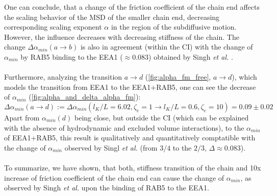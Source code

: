 \documentclass[
    paper=A4,pagesize=automedia,fontsize=12pt,
    BCOR=15mm,DIV=22,
    twoside,headinclude,footinclude=false,
    fleqn,             %
    bibliography=totocnumbered,          %
    listof=totoc,                %
    listof=flat,                 %
    cleardoublepage=empty      %
    numbers=endperiod
]{scrartcl}
\begin{document}
One can conclude, that a
change of the friction coefficient of the chain end affects the scaling behavior
of the MSD of the smaller chain end, decreasing corresponding scaling exponent $\alpha$ 
in the region of the subdiffusive motion. However, the influence decreases with 
decreasing stiffness of the chain. The change $\Delta \alpha_{min}(a \rightarrow b)$ is also
in agreement (within the CI) with the change of $\alpha_{min}$ by RAB5 binding to the EEA1 
($\approx 0.083$) obtained by Singh \emph{et al.} \cite{Singh:2022}.
\\
\\
Furthermore, analyzing the transition $a \rightarrow d$ (\autoref{fig:alpha_fm_free}, $a \rightarrow d$), 
which models the transition from 
EEA1 to the EEA1+RAB5, one can see the decrease of $\alpha_{min}$ (\autoref{fig:alpha_and_delta_alpha_fm}):
\begin{equation} \label{eq:alpha_min_l_p_zeta_e_trans}
    \Delta \alpha_{min}(a \rightarrow d) := \Delta \alpha_{min}(l_K/L=6.02,\zeta_e=1 \rightarrow l_K/L=0.6,\zeta_e=10) = 0.09 \pm 0.02
\end{equation}
Apart from $\alpha_{min}(d)$ being close, but outside the CI 
(which can be explained with the absence of hydrodynamic 
and excluded volume interactions), to the $\alpha_{min}$
of EEA1+RAB5, this result is qualitatively and quantitatively comptatible with the change
of $\alpha_{min}$ observed by Singl \emph{et al.} \cite{Singh:2022} 
(from $3/4$ to the $2/3$, $\Delta\approx0.083$).
\\
\\
To summarize, we have shown, that both, stiffness transition of the chain
and 10x increase of friction coefficient of the chain end can cause the change
of $\alpha_{min}$, as observed by Singh \emph{et al.} \cite{Singh:2022} 
upon the binding of RAB5 to the EEA1.
\end{document}
